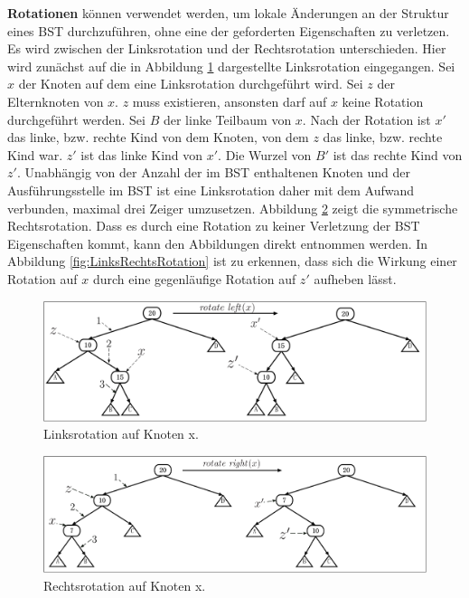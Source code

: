 \documentclass[a4paper,12pt]{article}
\begin{document}
\noindent\textbf{Rotationen} können verwendet werden, um lokale Änderungen an der Struktur eines BST durchzuführen, ohne eine der geforderten Eigenschaften zu verletzen. Es wird zwischen der Linksrotation und der Rechtsrotation 
unterschieden. Hier wird zunächst auf die in Abbildung \ref{fig:Linksrotation} dargestellte Linksrotation eingegangen. 
Sei $x$ der Knoten auf dem eine Linksrotation durchgeführt wird. Sei $z$ der Elternknoten von $x$. $z$ muss existieren, ansonsten darf auf $x$ keine Rotation durchgeführt werden. Sei $B$ der linke Teilbaum von $x$. Nach der Rotation ist $x'$ das linke, bzw. rechte Kind von dem Knoten, von dem $z$ das linke, bzw. rechte Kind war. $z'$ ist das linke Kind von $x'$. Die Wurzel von $B '$ ist das rechte Kind von $z'$. Unabhängig von der Anzahl der im BST enthaltenen Knoten und der Ausführungsstelle im BST ist eine Linksrotation daher mit dem Aufwand verbunden, maximal drei Zeiger umzusetzen. Abbildung \ref{fig:Rechtsrotation} zeigt die symmetrische Rechtsrotation. Dass es durch eine Rotation zu keiner Verletzung der BST Eigenschaften kommt, kann den Abbildungen direkt entnommen werden. In Abbildung \ref{fig:LinksRechtsRotation} ist zu erkennen, dass sich die Wirkung einer Rotation auf $x$ durch eine gegenläufige Rotation auf $z'$ aufheben lässt.  
\begin{figure}[H]
	\centering
	\includegraphics[width= 1\textwidth]{Medien/Einleitung/Linksrotation}
	\caption{Linksrotation auf Knoten x. }
	\label{fig:Linksrotation}
\end{figure}
\begin{figure}[H]
	\centering
	\includegraphics[width= 1\textwidth]{Medien/Einleitung/Rechtsrotation}
	\caption{Rechtsrotation auf Knoten x. }
	\label{fig:Rechtsrotation}
\end{figure}
\end{document}
